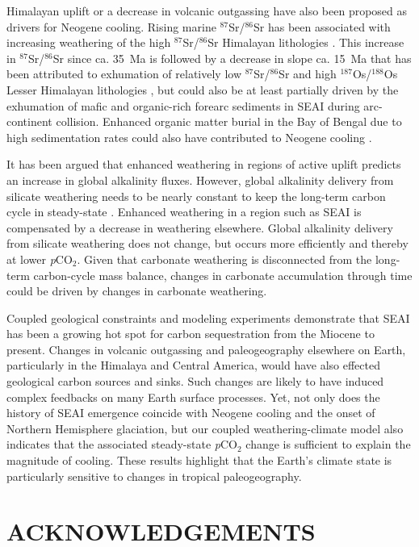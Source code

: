\documentclass[11pt,letterpaper]{article}
\newcommand{\SrSr}{$^{87}$Sr/$^{86}$Sr\xspace}
\newcommand{\OsOs}{$^{187}$Os/$^{188}$Os\xspace}
\newcommand{\pCOtwo}{\textit{p}CO$_{2}$\xspace}
\begin{document}
Himalayan uplift \cite{Raymo1992a, Galy2007a} or a decrease in volcanic outgassing \cite{Berner1983a} have also been proposed as drivers for Neogene cooling. Rising marine \SrSr has been associated with increasing weathering of the high \SrSr Himalayan lithologies \cite{Raymo1992a}. This increase in \SrSr since ca. 35~Ma is followed by a decrease in slope ca. 15~Ma that has been attributed to exhumation of relatively low \SrSr and high \OsOs Lesser Himalayan lithologies \cite{Colleps2018a}, but could also be at least partially driven by the exhumation of mafic and organic-rich forearc sediments in SEAI during arc-continent collision. Enhanced organic matter burial in the Bay of Bengal due to high sedimentation rates could also have contributed to Neogene cooling \cite{Galy2007a}.

It has been argued that enhanced weathering in regions of active uplift predicts an increase in global alkalinity fluxes. However, global alkalinity delivery from silicate weathering needs to be nearly constant to keep the long-term carbon cycle in steady-state \cite{Kump1997a}. Enhanced weathering in a region such as SEAI is compensated by a decrease in weathering elsewhere. Global alkalinity delivery from silicate weathering does not change, but occurs more efficiently and thereby at lower \pCOtwo. Given that carbonate weathering is disconnected from the long-term carbon-cycle mass balance, changes in carbonate accumulation through time \cite{Si2019a} could be driven by changes in carbonate weathering.

Coupled geological constraints and modeling experiments demonstrate that SEAI has been a growing hot spot for carbon sequestration from the Miocene to present. Changes in volcanic outgassing and paleogeography elsewhere on Earth, particularly in the Himalaya and Central America, would have also effected geological carbon sources and sinks. Such changes are likely to have induced complex feedbacks on many Earth surface processes. Yet, not only does the history of SEAI emergence coincide with Neogene cooling and the onset of Northern Hemisphere glaciation, but our coupled weathering-climate model also indicates that the associated steady-state \pCOtwo change is sufficient to explain the magnitude of cooling. These results highlight that the Earth's climate state is particularly sensitive to changes in tropical paleogeography.

\section*{ACKNOWLEDGEMENTS \label{sec:ACKNOWLEDGEMENTS}}
\end{document}
